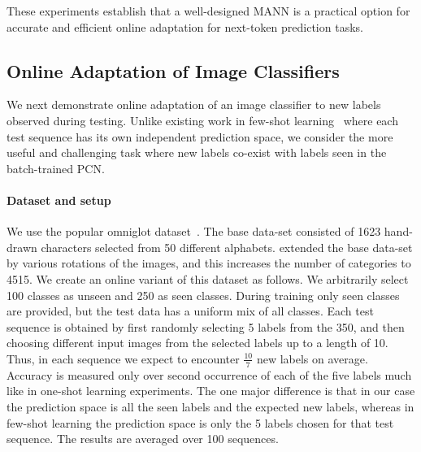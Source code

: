 \documentclass[letterpaper]{article} %
\begin{document}
These experiments establish that a well-designed MANN is a practical option for accurate and efficient online adaptation for next-token prediction tasks.

\subsection{Online Adaptation of Image Classifiers}
\label{sec-expt-rare}
We next demonstrate online adaptation of an image classifier to new labels observed during testing.  Unlike existing work in few-shot learning~\cite{VinyalsBLKW16} where each test sequence has its own independent prediction space, we consider the more useful and challenging task where new labels co-exist with labels seen in the batch-trained PCN.

\paragraph*{Dataset and setup} We use the popular omniglot dataset~\cite{Lake1332}. The base data-set consisted of 1623 hand-drawn characters selected from 50 different alphabets.  \cite{VinyalsBLKW16} extended the base data-set by various rotations of the images, and this increases the number of categories to 4515.
 We create an online variant of this dataset as follows. We arbitrarily select 100 classes as unseen and 250 as seen classes. During training only seen classes are provided, but the test data has a uniform mix of all classes. Each test sequence is obtained by first randomly selecting 5 labels from the 350, and then choosing different input images from the selected labels up to a length of 10.
Thus, in each sequence we expect to encounter $\frac{10}{7}$ new labels on average.   Accuracy is measured only over second occurrence of each of the five labels much like in one-shot learning experiments. The one major difference is that in our case the prediction space is all the seen labels and the expected new labels, whereas in few-shot learning the prediction space is only the 5 labels chosen for that test sequence. The results are averaged over 100 sequences.
\end{document}
